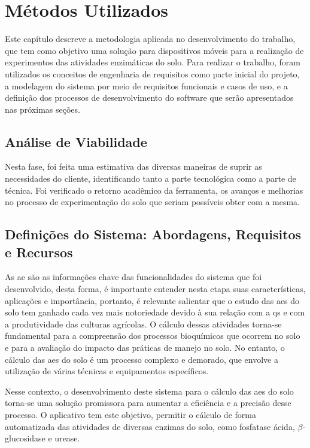 \chapter{Métodos Utilizados}\label{ch:metodos}
Este capítulo descreve a metodologia aplicada no desenvolvimento do trabalho, que tem como objetivo uma solução para dispositivos móveis para a realização de experimentos das atividades enzimáticas do solo. Para realizar o trabalho, foram utilizados os conceitos de engenharia de requisitos como parte inicial do projeto, a modelagem do sistema por meio de requisitos funcionais e casos de uso, e a definição dos processos de desenvolvimento do software que serão apresentados nas próximas seções.

\section{Análise de Viabilidade}\label{sec:analise_viabilidade}
Nesta fase, foi feita uma estimativa das diversas maneiras de suprir as necessidades do cliente, identificando tanto a parte tecnológica como a parte de técnica. Foi verificado o retorno acadêmico da ferramenta, os avanços e melhorias no processo de experimentação do solo que seriam possíveis obter com a mesma.

\section{Definições do Sistema: Abordagens, Requisitos e Recursos}\label{sec:eng_sys}
As \ac{ae} são as informações chave das funcionalidades do sistema que foi desenvolvido, desta forma, é importante entender nesta etapa suas características, aplicações e importância, portanto, é relevante salientar que o estudo das \acp{ae} do solo tem ganhado cada vez mais notoriedade devido à sua relação com a \ac{qs} e com a produtividade das culturas agrícolas. O cálculo dessas atividades torna-se fundamental para a compreensão dos processos bioquímicos que ocorrem no solo e para a avaliação do impacto das práticas de manejo no solo. No entanto, o cálculo das \acp{ae} do solo é um processo complexo e demorado, que envolve a utilização de várias técnicas e equipamentos específicos.

Nesse contexto, o desenvolvimento deste sistema para o cálculo das \acp{ae} do solo torna-se uma solução promissora para aumentar a eficiência e a precisão desse processo. O aplicativo tem este objetivo, permitir o cálculo de forma automatizada das atividades de diversas enzimas do solo, como fosfatase ácida, $\beta$-glucosidase e urease.

